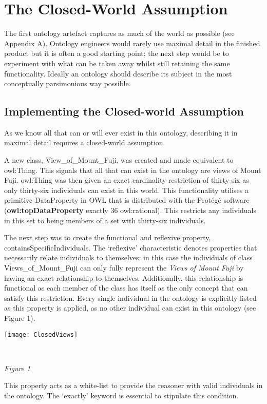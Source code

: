 \documentclass[titlepage,a4paper,12pt,oneside]{book}
\begin{document}
\section{The Closed-World Assumption}
The first ontology artefact captures as much of the world as possible (see Appendix A).
Ontology engineers would rarely use maximal detail in the finished product but it is often a good starting point; the next step would be to experiment with what can be taken away whilst still retaining the same functionality.
Ideally an ontology should describe its subject in the most conceptually parsimonious way possible.
\subsection{Implementing the Closed-world Assumption}
As we know all that can or will ever exist in this ontology, describing it in maximal detail requires a closed-world assumption.\par
A new class, View\_of\_Mount\_Fuji, was created and made equivalent to owl:Thing.
This signals that all that can exist in the ontology are views of Mount Fuji.
owl:Thing was then given an exact cardinality restriction of thirty-six as only thirty-six individuals can exist in this world.
This functionality utilises a primitive DataProperty in OWL that is distributed with the Protégé software (\textbf{owl:topDataProperty} exactly 36 owl:rational).
This restricts any individuals in this set to being members of a set with thirty-six individuals.\par
The next step was to create the functional and reflexive property, containsSpecificIndividuals.
The `reflexive' characteristic denotes properties that necessarily relate individuals to themselves: in this case the individuals of class Views\_of\_Mount\_Fuji can only fully represent the \textit{Views of Mount Fuji} by having an exact relationship to themselves.
Additionally, this relationship is functional as each member of the class has itself as the only concept that can satisfy this restriction. 
Every single individual in the ontology is explicitly listed as this property is applied, as no other individual can exist in this ontology (see Figure 1).
\newline
\centerline{\texttt{[image: ClosedViews]}}\\
\centerline{\textit{Figure 1}}
\newline
This property acts as a white-list to provide the reasoner with valid individuals in the ontology. The `exactly' keyword is essential to stipulate this condition.
\end{document}

